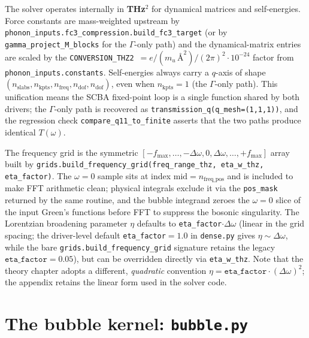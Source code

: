 The solver operates internally in \textbf{THz$^2$} for dynamical
matrices and self-energies.  Force constants are mass-weighted
upstream by
\texttt{phonon\_inputs.fc3\_compression.build\_fc3\_target} (or by
\texttt{gamma\_project\_M\_blocks} for the $\Gamma$-only path) and the
dynamical-matrix entries are scaled by the
\texttt{CONVERSION\_THZ2}~$= e/(m_u\,\text{\AA}^2)/(2\pi)^2\cdot 10^{-24}$
factor from \texttt{phonon\_inputs.constants}.  Self-energies always
carry a $q$-axis of shape
$(n_\mathrm{slabs}, n_\mathrm{kpts}, n_\mathrm{freq}, n_\mathrm{dof}, n_\mathrm{dof})$,
even when $n_\mathrm{kpts}=1$ (the $\Gamma$-only path).  This
unification means the SCBA fixed-point loop is a single function
shared by both drivers; the $\Gamma$-only path is recovered as
\texttt{transmission\_q(q\_mesh=(1,1,1))}, and the regression check
\texttt{compare\_q11\_to\_finite} asserts that the two paths produce
identical $T(\omega)$.

The frequency grid is the symmetric
$[-f_\mathrm{max}, \ldots, -\Delta\omega, 0, \Delta\omega, \ldots,
+f_\mathrm{max}]$ array built by
\texttt{grids.build\_frequency\_grid(freq\_range\_thz, eta\_w\_thz,
eta\_factor)}.  The $\omega = 0$ sample sits at index
$\mathrm{mid} = n_\mathrm{freq\_pos}$ and is included to make FFT
arithmetic clean; physical integrals exclude it via the
\texttt{pos\_mask} returned by the same routine, and the
bubble integrand zeroes the $\omega=0$ slice of the input Green's
functions before FFT to suppress the bosonic singularity.  The
Lorentzian broadening parameter $\eta$ defaults to
\texttt{eta\_factor}$\cdot \Delta\omega$ (linear in the grid spacing;
the driver-level default \texttt{eta\_factor}$=1.0$ in
\texttt{dense.py} gives $\eta\sim\Delta\omega$, while the bare
\texttt{grids.build\_frequency\_grid} signature retains the legacy
$\texttt{eta\_factor}=0.05$), but can be overridden
directly via \texttt{eta\_w\_thz}.  Note that the theory chapter adopts a
different, \emph{quadratic} convention $\eta = \texttt{eta\_factor}\cdot
(\Delta\omega)^2$; the appendix retains the linear form used in the solver
code.

\section{The bubble kernel: \texttt{bubble.py}}
\label{sec:bubble_kernel}


